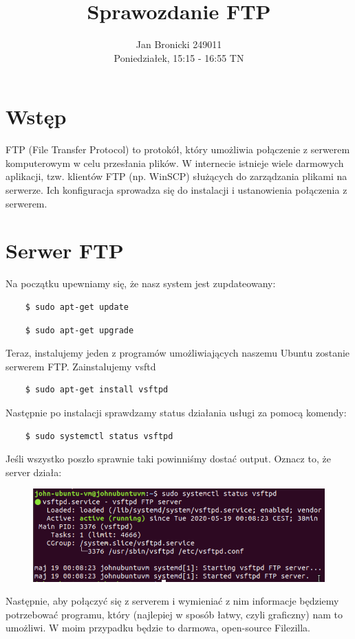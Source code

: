 \documentclass{article}
\title{Sprawozdanie FTP}
\author{Jan Bronicki 249011\\Poniedziałek, 15:15 - 16:55 TN}
\date{}
\begin{document}
\maketitle

\section{Wstęp}
FTP (File Transfer Protocol) to protokół, który umożliwia połączenie z serwerem komputerowym w celu przesłania plików. W internecie istnieje wiele darmowych aplikacji, tzw. klientów FTP (np. WinSCP) służących do zarządzania plikami na serwerze. Ich konfiguracja sprowadza się do instalacji i ustanowienia połączenia z serwerem.
\section{Serwer FTP}


Na początku upewniamy się, że nasz system jest zupdateowany:

\begin{lstlisting}
    $ sudo apt-get update
\end{lstlisting}

\begin{lstlisting}
    $ sudo apt-get upgrade
\end{lstlisting}

Teraz, instalujemy jeden z programów umożliwiających naszemu Ubuntu zostanie serwerem FTP. Zainstalujemy vsftd
\begin{lstlisting}
    $ sudo apt-get install vsftpd
\end{lstlisting}
Następnie po instalacji sprawdzamy status działania usługi za pomocą komendy:
\begin{lstlisting}
    $ sudo systemctl status vsftpd
\end{lstlisting}
Jeśli wszystko poszło sprawnie taki powinniśmy dostać output. Oznacz to, że server działa:

\begin{figure}[h!]
    \includegraphics[scale=0.6]{ssytemctl.png}
    \centering
\end{figure}
 \newpage
Następnie, aby połączyć się z serverem i wymieniać z nim informacje będziemy potrzebować programu, który (najlepiej w sposób łatwy, czyli graficzny) nam to umożliwi. W moim przypadku będzie to darmowa, open-source Filezilla.
\end{document}
